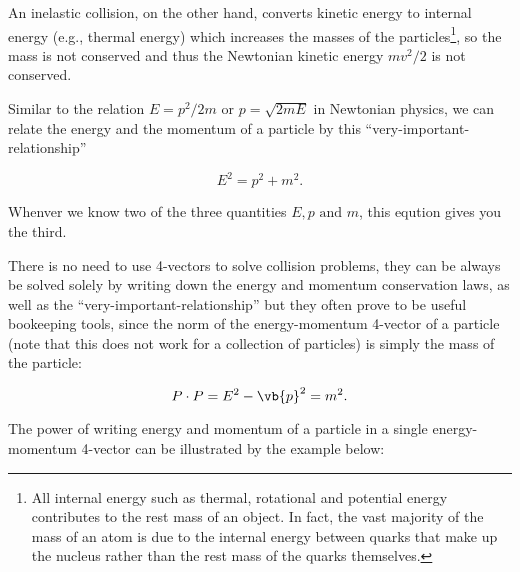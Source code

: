 \documentclass[english,a4paper,12pt]{report}
\begin{document}
An inelastic collision, on the other hand, converts kinetic energy to internal energy (e.g., thermal energy) which increases the masses of the particles\footnote{All internal energy such as thermal, rotational and potential energy contributes to the rest mass of an object. In fact, the vast majority of the mass of an atom is due to the internal energy between quarks that make up the nucleus rather than the rest mass of the quarks themselves.}, so the mass is not conserved and thus the Newtonian kinetic energy \(mv^2 /2\) is not conserved. 

Similar to the relation \(E = p^2/2m \text { or } p = \sqrt{2mE}  \) in Newtonian physics, we can relate the energy and the momentum of a particle by this ``very-important-relationship''

\begin{equation}\label{veryimportantrelationship} 
    E^2 = p^2 + m^2.
\end{equation}

Whenver we know two of the three quantities \(E,p \text { and }  m\), this eqution gives you the third.

There is no need to use 4-vectors to solve collision problems, they can be always be solved solely by writing down the energy and momentum conservation laws, as well as the ``very-important-relationship'' but they often prove to be useful bookeeping tools, since the norm of the energy-momentum 4-vector of a particle (note that this does not work for a collection of particles) is simply the mass of the particle: 

\begin{equation}
    P \cdot P = E^2 - \vb{p} ^2 = m^2.
\end{equation}

The power of writing energy and momentum of a particle in a single energy-momentum 4-vector can be illustrated by the example below:
\end{document}
